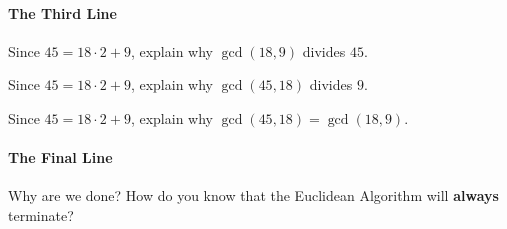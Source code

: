 \paragraph{The Third Line}
\begin{prob}
Since $45 = 18\cdot 2 + 9$, explain why $\gcd(18,9)$ divides $45$.
\end{prob}

\begin{prob}
Since $45 = 18\cdot 2 + 9$, explain why $\gcd(45,18)$ divides $9$.
\end{prob}

\begin{prob}
Since $45 = 18\cdot 2 + 9$, explain why $\gcd(45,18) = \gcd(18,9)$.
\end{prob}


\paragraph{The Final Line}

\begin{prob}
Why are we done? How do you know that the Euclidean Algorithm
will \textbf{always} terminate?
\end{prob}
